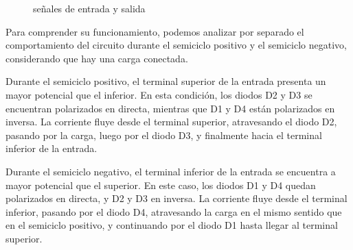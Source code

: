 \begin{figure}[h]
  \begin{minipage}[t][5cm][c]{0.5 \textwidth}
    \centering
  \end{minipage}
  \begin{minipage}[t][5cm][c]{0.5 \textwidth}
    \centering
  \end{minipage}
  \caption{señales de entrada y salida}
\end{figure}

Para comprender su funcionamiento, podemos analizar por separado el comportamiento del circuito durante el semiciclo positivo y el
semiciclo negativo, considerando que hay una carga conectada.

Durante el semiciclo positivo, el terminal superior de la entrada presenta un mayor potencial que el inferior. En esta condición, los diodos
D2 y D3 se encuentran polarizados en directa, mientras que D1 y D4 están polarizados en inversa. La corriente fluye desde el terminal
superior, atravesando el diodo D2, pasando por la carga, luego por el diodo D3, y finalmente hacia el terminal inferior de la entrada.

Durante el semiciclo negativo, el terminal inferior de la entrada se encuentra a mayor potencial que el superior. En este caso, los diodos
D1 y D4 quedan polarizados en directa, y D2 y D3 en inversa. La corriente fluye desde el terminal inferior, pasando por el diodo D4,
atravesando la carga en el mismo sentido que en el semiciclo positivo, y continuando por el diodo D1 hasta llegar al terminal superior.

